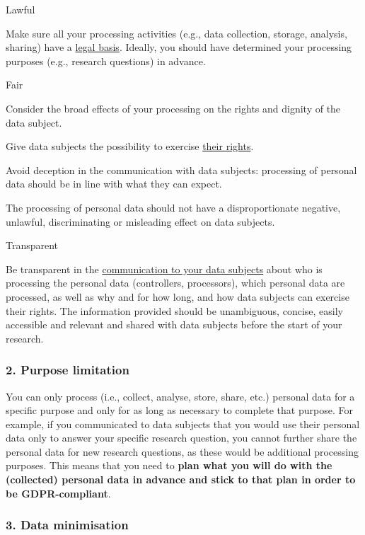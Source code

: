 \documentclass[
]{book}
\begin{document}
Lawful

Make sure all your processing activities (e.g., data collection, storage,
analysis, sharing) have a \protect\hyperlink{legal-basis}{legal basis}. Ideally,
you should have determined your processing purposes (e.g., research questions)
in advance.

Fair

Consider the broad effects of your processing on the rights and dignity of the data subject.

Give data subjects the possibility to exercise \protect\hyperlink{data-subject-rights}{their rights}.

Avoid deception in the communication with data subjects: processing of personal data should be in line with what they can expect.

The processing of personal data should not have a disproportionate negative, unlawful, discriminating or misleading effect on data subjects.

Transparent

Be transparent in the \protect\hyperlink{privacy-notices}{communication to your data subjects}
about who is processing the personal data (controllers, processors), which
personal data are processed, as well as why and for how long, and how data
subjects can exercise their rights. The information provided should be
unambiguous, concise, easily accessible and relevant and shared with data
subjects before the start of your research.

\hypertarget{purpose-limitation}{%
\subsubsection{2. Purpose limitation}\label{purpose-limitation}}

You can only process (i.e., collect, analyse, store, share, etc.) personal data
for a specific purpose and only for as long as necessary to complete that purpose.
For example, if you communicated to data subjects that you would use their
personal data only to answer your specific research question, you cannot further
share the personal data for new research questions, as these would be additional
processing purposes. This means that you need to \textbf{plan what you will do with
the (collected) personal data in advance and stick to that plan in order to be
GDPR-compliant}.

\hypertarget{data-minimisation}{%
\subsubsection{3. Data minimisation}\label{data-minimisation}}
\end{document}
